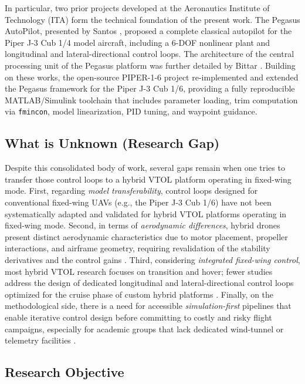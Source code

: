 \documentclass{ieeeaccess}
\begin{document}
In particular, two prior projects developed at the Aeronautics Institute of Technology (ITA) form the technical foundation of the present work. The Pegasus AutoPilot, presented by Santos \cite{santos2018projeto}, proposed a complete classical autopilot for the Piper J-3 Cub 1/4 model aircraft, including a 6-DOF nonlinear plant and longitudinal and lateral-directional control loops. The architecture of the central processing unit of the Pegasus platform was further detailed by Bittar \cite{bittar2012arquitetura}. Building on these works, the open-source PIPER-1-6 project \cite{martins2025piper} re-implemented and extended the Pegasus framework for the Piper J-3 Cub 1/6, providing a fully reproducible MATLAB/Simulink toolchain that includes parameter loading, trim computation via \texttt{fmincon}, model linearization, PID tuning, and waypoint guidance.

\subsection{What is Unknown (Research Gap)}

Despite this consolidated body of work, several gaps remain when one tries to transfer those control loops to a hybrid VTOL platform operating in fixed-wing mode. First, regarding \textit{model transferability}, control loops designed for conventional fixed-wing UAVs (e.g., the Piper J-3 Cub 1/6) have not been systematically adapted and validated for hybrid VTOL platforms operating in fixed-wing mode. Second, in terms of \textit{aerodynamic differences}, hybrid drones present distinct aerodynamic characteristics due to motor placement, propeller interactions, and airframe geometry, requiring revalidation of the stability derivatives and the control gains \cite{saeed2018survey,theys2016influence}. Third, considering \textit{integrated fixed-wing control}, most hybrid VTOL research focuses on transition and hover; fewer studies address the design of dedicated longitudinal and lateral-directional control loops optimized for the cruise phase of custom hybrid platforms \cite{ducard2021review}. Finally, on the methodological side, there is a need for accessible \textit{simulation-first} pipelines that enable iterative control design before committing to costly and risky flight campaigns, especially for academic groups that lack dedicated wind-tunnel or telemetry facilities \cite{filho2019aerodynamic,bristeau2009role}.

\subsection{Research Objective}
\end{document}
